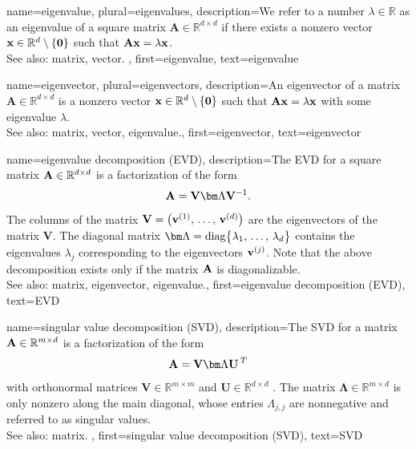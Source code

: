 {
{name={eigenvalue}, plural={eigenvalues}, 
	description={We refer to a 
		number $\lambda \in \mathbb{R}$ as an eigenvalue of a square matrix $\mathbf{A} \in \mathbb{R}^{d \times d}$ 
		if there exists a nonzero vector ${\bf x} \in \mathbb{R}^{d} \setminus \{ \mathbf{0} \}$ such that $\mathbf{A} {\bf x} = \lambda {\bf x}$.
		\\
		See also: matrix, vector. },
	first={eigenvalue},
	text={eigenvalue} 
}
	
{name={eigenvector}, plural={eigenvectors}, 
	description={An 
		eigenvector of a matrix $\mathbf{A} \in \mathbb{R}^{d \times d}$ 
		is a nonzero vector ${\bf x} \in \mathbb{R}^{d} \setminus \{ \mathbf{0} \}$ 
		such that $\mathbf{A} {\bf x} = \lambda {\bf x}$ with some eigenvalue $\lambda$.
				\\
		See also: matrix, vector, eigenvalue.},
	first={eigenvector},
	text={eigenvector} 
}

{name={eigenvalue decomposition (EVD)}, 
	description={The EVD
		for a square matrix ${\bf A} \in \mathbb{R}^{d \times d}$ 
		is a factorization of the form 
		$${\bf A} = \mathbf{V} {\bm \Lambda} \mathbf{V}^{-1}.$$ 
		The columns of the matrix $\mathbf{V} = \big( {\bf v}^{(1)}, \,\ldots, \,{\bf v}^{(d)} \big)$ are the 
		eigenvectors of the matrix $\mathbf{V}$. The diagonal matrix 
		${\bm \Lambda} = {\rm diag} \big\{ \lambda_{1}, \,\ldots, \,\lambda_{d} \big\}$ 
		contains the eigenvalues $\lambda_{j}$ corresponding to the eigenvectors ${\bf v}^{(j)}$. 
		Note that the above decomposition exists only if the matrix ${\bf A}$ is diagonalizable.
				\\
		See also: matrix, eigenvector, eigenvalue.},
	first={eigenvalue decomposition (EVD)},
	text={EVD} 
}

{name={singular value decomposition (SVD)}, 
  	description={The SVD  
  		for a matrix ${\bf A} \in \mathbb{R}^{m \times d}$ 
		is a factorization of the form 
		$${\bf A} = \mathbf{V} {\bm \Lambda} \mathbf{U}\,^{T}$$ 
		with orthonormal matrices $\mathbf{V} \in \mathbb{R}^{m \times m}$ 
		and $\mathbf{U} \in \mathbb{R}^{d \times d}$ \cite{GolubVanLoanBook}. 
		The matrix ${\bm \Lambda} \in \mathbb{R}^{m \times d}$ is 
		only nonzero along the main diagonal, whose entries $\Lambda_{j,j}$ 
		are nonnegative and referred to as singular values.
		\\
		See also: matrix. },
	first={singular value decomposition (SVD)},
	text={SVD} 
}


}
